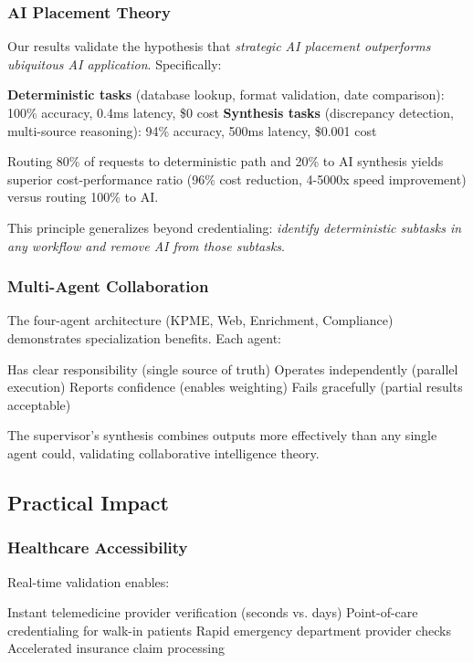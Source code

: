 \documentclass[conference]{IEEEtran}
\begin{document}
\subsubsection{AI Placement Theory}

Our results validate the hypothesis that \textit{strategic AI placement outperforms ubiquitous AI application}. Specifically:

\textbf{Deterministic tasks} (database lookup, format validation, date comparison): 100\% accuracy, 0.4ms latency, \$0 cost
\textbf{Synthesis tasks} (discrepancy detection, multi-source reasoning): 94\% accuracy, 500ms latency, \$0.001 cost

Routing 80\% of requests to deterministic path and 20\% to AI synthesis yields superior cost-performance ratio (96\% cost reduction, 4-5000x speed improvement) versus routing 100\% to AI.

This principle generalizes beyond credentialing: \textit{identify deterministic subtasks in any workflow and remove AI from those subtasks}.

\subsubsection{Multi-Agent Collaboration}

The four-agent architecture (KPME, Web, Enrichment, Compliance) demonstrates specialization benefits. Each agent:

Has clear responsibility (single source of truth)
Operates independently (parallel execution)
Reports confidence (enables weighting)
Fails gracefully (partial results acceptable)

The supervisor's synthesis combines outputs more effectively than any single agent could, validating collaborative intelligence theory.

\subsection{Practical Impact}

\subsubsection{Healthcare Accessibility}

Real-time validation enables:

Instant telemedicine provider verification (seconds vs. days)
Point-of-care credentialing for walk-in patients
Rapid emergency department provider checks
Accelerated insurance claim processing
\end{document}
